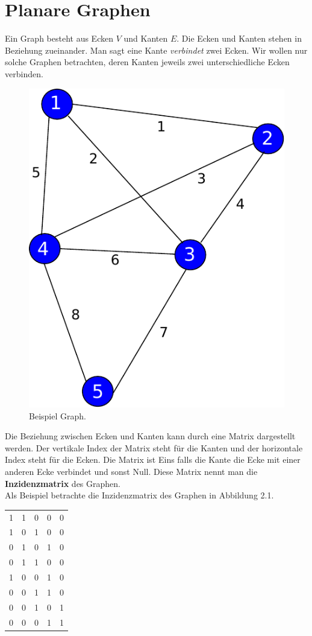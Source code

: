 \documentclass[11pt,a4paper,leqno]{report}
\numberwithin{equation}{chapter}
\begin{document}
\chapter{Planare Graphen}
	Ein Graph besteht aus Ecken $V$ und Kanten $E$. Die Ecken und Kanten stehen in Beziehung zueinander. Man sagt eine Kante \emph{verbindet} zwei Ecken. Wir wollen nur solche Graphen betrachten, deren Kanten jeweils zwei unterschiedliche Ecken verbinden.
\begin{figure}[H]
	\begin{center}
		\includegraphics[scale=0.4]{Abbildungen/graph_1.pdf}
		\caption{Beispiel Graph.}
	\end{center}
\end{figure}
\noindent
	Die Beziehung zwischen Ecken und Kanten kann durch eine Matrix dargestellt werden. Der vertikale Index der Matrix steht f\"ur die Kanten und der horizontale Index steht f\"ur die Ecken. Die Matrix ist Eins falls die Kante die Ecke mit einer anderen Ecke verbindet und sonst Null. Diese Matrix nennt man die \textbf{Inzidenzmatrix} des Graphen.\\
	Als Beispiel betrachte die Inzidenzmatrix des Graphen in Abbildung 2.1.
	\begin{center}
		\begin{tabular}{c c c c c}
			1 & 1 & 0 & 0 & 0\\
			1 & 0 & 1 & 0 & 0\\
			0 & 1 & 0 & 1 & 0\\
			0 & 1 & 1 & 0 & 0\\
			1 & 0 & 0 & 1 & 0\\
			0 & 0 & 1 & 1 & 0\\
			0 & 0 & 1 & 0 & 1\\
			0 & 0 & 0 & 1 & 1\\
		\end{tabular} 
	\end{center}
\end{document}
